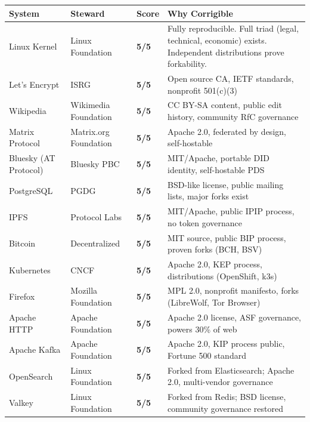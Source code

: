 \begin{table}[htbp]
\centering
\small
\renewcommand{\arraystretch}{1.3}
\begin{tabular}{@{}l>{\raggedright}p{3.2cm}>{\centering\arraybackslash}p{1.2cm}p{5.8cm}@{}}
\toprule
\rowcolor{gray!15}
\textbf{System} & \textbf{Steward} & \textbf{Score} & \textbf{Why Corrigible} \\
\midrule
\rowcolor{green!8}
Linux Kernel & Linux Foundation & \textbf{5/5} & Fully reproducible. Full triad (legal, technical, economic) exists. Independent distributions prove forkability. \\
Let's Encrypt & ISRG & \textbf{5/5} & Open source CA, IETF standards, nonprofit 501(c)(3) \\
\rowcolor{green!8}
Wikipedia & Wikimedia Foundation & \textbf{5/5} & CC BY-SA content, public edit history, community RfC governance \\
Matrix Protocol & Matrix.org Foundation & \textbf{5/5} & Apache 2.0, federated by design, self-hostable \\
\rowcolor{green!8}
Bluesky (AT Protocol) & Bluesky PBC & \textbf{5/5} & MIT/Apache, portable DID identity, self-hostable PDS \\
PostgreSQL & PGDG & \textbf{5/5} & BSD-like license, public mailing lists, major forks exist \\
\rowcolor{green!8}
IPFS & Protocol Labs & \textbf{5/5} & MIT/Apache, public IPIP process, no token governance \\
Bitcoin & Decentralized & \textbf{5/5} & MIT source, public BIP process, proven forks (BCH, BSV) \\
\rowcolor{green!8}
Kubernetes & CNCF & \textbf{5/5} & Apache 2.0, KEP process, distributions (OpenShift, k3s) \\
Firefox & Mozilla Foundation & \textbf{5/5} & MPL 2.0, nonprofit manifesto, forks (LibreWolf, Tor Browser) \\
\rowcolor{green!8}
Apache HTTP & Apache Foundation & \textbf{5/5} & Apache 2.0 license, ASF governance, powers 30\% of web \\
Apache Kafka & Apache Foundation & \textbf{5/5} & Apache 2.0, KIP process public, Fortune 500 standard \\
\rowcolor{green!8}
OpenSearch & Linux Foundation & \textbf{5/5} & Forked from Elasticsearch; Apache 2.0, multi-vendor governance \\
Valkey & Linux Foundation & \textbf{5/5} & Forked from Redis; BSD license, community governance restored \\

\end{tabular}
\end{table}

